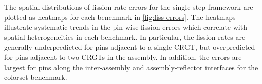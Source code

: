 The spatial distributions of fission rate errors for the single-step framework are plotted as heatmaps for each benchmark in \autoref{fig:fiss-errors}. The heatmaps illustrate systematic trends in the pin-wise fission errors which correlate with spatial heterogeneities in each benchmark. In particular, the fission rates are generally underpredicted for pins adjacent to a single CRGT, but overpredicted for pins adjacent to two CRGTs in the assembly. In addition, the errors are largest for pins along the inter-assembly and assembly-reflector interfaces for the colorset benchmark.


